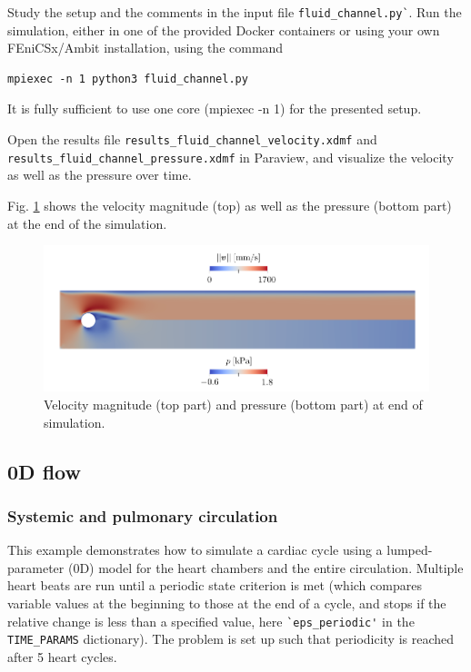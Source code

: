 \documentclass[a4paper,12pt]{report}
\begin{document}
Study the setup and the comments in the input file \verb#fluid_channel.py`#. Run the simulation, either in one of the provided Docker containers or using your own FEniCSx/Ambit installation, using the command

\begin{verbatim}
mpiexec -n 1 python3 fluid_channel.py
\end{verbatim}

It is fully sufficient to use one core (mpiexec -n 1) for the presented setup.

Open the results file \verb"results_fluid_channel_velocity.xdmf" and \\ \verb"results_fluid_channel_pressure.xdmf" in Paraview, and visualize the velocity as well as the pressure over time.

Fig. \ref{fig:channel_results} shows the velocity magnitude (top) as well as the pressure (bottom part) at the end of the simulation.

\begin{figure}[ht]
\centering
\includegraphics[width=1.0\columnwidth]{fig/channel_results}
\caption{Velocity magnitude (top part) and pressure (bottom part) at end of simulation.}
\label{fig:channel_results}
\end{figure}


\subsection{0D flow}\label{subsec:demos:flow0d}

\subsubsection*{Systemic and pulmonary circulation}

This example demonstrates how to simulate a cardiac cycle using a lumped-parameter (0D) model for the heart chambers and the entire circulation. Multiple heart beats are run
until a periodic state criterion is met (which compares variable values at the beginning to those at the end of a cycle, and stops if the relative change is less than
a specified value, here \verb"`eps_periodic'" in the \verb"TIME_PARAMS" dictionary). The problem is set up such that periodicity is reached after 5 heart cycles.
\end{document}
